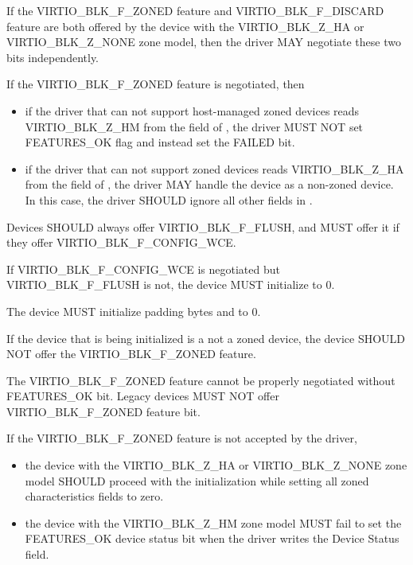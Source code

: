 If the VIRTIO_BLK_F_ZONED feature and VIRTIO_BLK_F_DISCARD feature are both
offered by the device with the VIRTIO_BLK_Z_HA or VIRTIO_BLK_Z_NONE zone model,
then the driver MAY negotiate these two bits independently.

If the VIRTIO_BLK_F_ZONED feature is negotiated, then
\begin{itemize}
\item if the driver that can not support host-managed zoned devices
    reads VIRTIO_BLK_Z_HM from the  field of , the
    driver MUST NOT set FEATURES_OK flag and instead set the FAILED bit.

\item if the driver that can not support zoned devices reads VIRTIO_BLK_Z_HA
    from the  field of , the driver
    MAY handle the device as a non-zoned device. In this case, the
    driver SHOULD ignore all other fields in .
\end{itemize}


Devices SHOULD always offer VIRTIO_BLK_F_FLUSH, and MUST offer it
if they offer VIRTIO_BLK_F_CONFIG_WCE.

If VIRTIO_BLK_F_CONFIG_WCE is negotiated but VIRTIO_BLK_F_FLUSH
is not, the device MUST initialize  to 0.

The device MUST initialize padding bytes  and
 to 0.

If the device that is being initialized is a not a zoned device, the device
SHOULD NOT offer the VIRTIO_BLK_F_ZONED feature.

The VIRTIO_BLK_F_ZONED feature cannot be properly negotiated without
FEATURES_OK bit. Legacy devices MUST NOT offer VIRTIO_BLK_F_ZONED feature bit.

If the VIRTIO_BLK_F_ZONED feature is not accepted by the driver,
\begin{itemize}
\item the device with the VIRTIO_BLK_Z_HA or VIRTIO_BLK_Z_NONE zone model SHOULD
    proceed with the initialization while setting all zoned characteristics
    fields to zero.

\item the device with the VIRTIO_BLK_Z_HM zone model MUST fail to set the
    FEATURES_OK device status bit when the driver writes the Device Status
    field.
\end{itemize}

